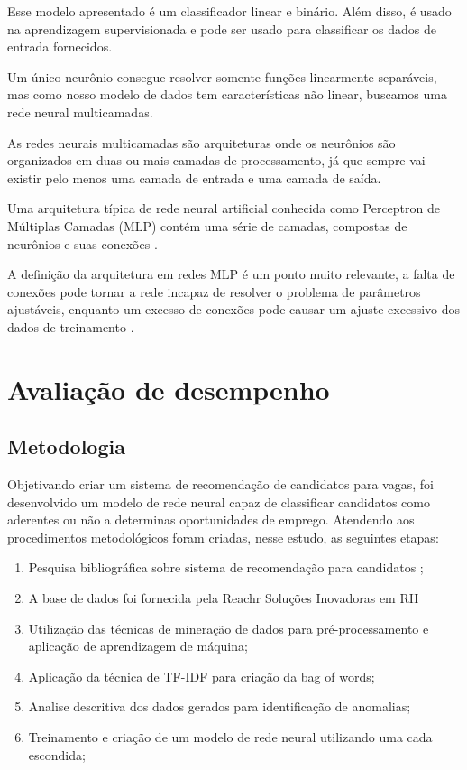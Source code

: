 \documentclass[conference]{IEEEtran}
\begin{document}
    Esse modelo apresentado é um classificador linear e binário. Além disso, é usado na aprendizagem supervisionada e pode ser usado para classificar os dados de entrada fornecidos.
    
    Um único neurônio consegue resolver somente funções linearmente separáveis, mas como nosso modelo de dados tem características não linear, buscamos uma rede neural multicamadas.
    
    As redes neurais multicamadas são arquiteturas onde os neurônios são organizados em
    duas ou mais camadas de processamento, já que sempre vai existir pelo menos uma camada
    de entrada e uma camada de saída. 
    
    Uma arquitetura típica de rede neural artificial conhecida como Perceptron de Múltiplas Camadas (MLP) contém uma série de camadas, compostas de neurônios e suas conexões \cite{b14}. 
    
    A definição da arquitetura em redes MLP é um ponto muito relevante, a falta de conexões pode tornar a rede incapaz de resolver o problema de parâmetros ajustáveis, enquanto um excesso de conexões pode causar um ajuste excessivo dos dados de treinamento \cite{rede_neural}.
  
   \section{Avaliação de desempenho}
	 \subsection{Metodologia}

Objetivando criar um sistema de recomendação de candidatos para vagas, foi desenvolvido um modelo de rede neural capaz de classificar candidatos como aderentes ou não a determinas oportunidades de emprego.
Atendendo aos procedimentos metodológicos foram criadas, nesse estudo, as seguintes etapas:

\begin{enumerate}
\item Pesquisa bibliográfica sobre sistema de recomendação para candidatos \cite{artigo_referencia};
\item A base de dados foi fornecida pela Reachr Soluções Inovadoras em RH
\item Utilização das técnicas de mineração de dados para pré-processamento e aplicação de aprendizagem de máquina;
\item Aplicação da técnica de TF-IDF para criação da bag of words;
\item Analise descritiva dos dados gerados para identificação de anomalias;
\item Treinamento e criação de um modelo de rede neural utilizando uma cada escondida;
\end{enumerate}
\end{document}
